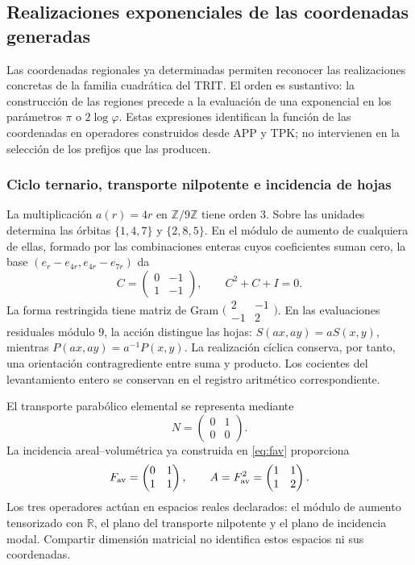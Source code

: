 \subsection{Realizaciones exponenciales de las coordenadas generadas}
\label{euler-trit-articulacion}

Las coordenadas regionales ya determinadas permiten reconocer las
realizaciones concretas de la familia cuadrática del TRIT. El orden es
sustantivo: la construcción de las regiones precede a la evaluación de una
exponencial en los parámetros \(\pi\) o \(2\log\varphi\). Estas expresiones
identifican la función de las coordenadas en operadores construidos desde
APP y TPK; no intervienen en la selección de los prefijos que las producen.

\subsubsection{Ciclo ternario, transporte nilpotente e incidencia de hojas}

La multiplicación \(a(r)=4r\) en \(\mathbb Z/9\mathbb Z\) tiene orden
\(3\). Sobre las unidades determina las órbitas \(\{1,4,7\}\) y
\(\{2,8,5\}\). En el módulo de aumento de cualquiera de ellas, formado por
las combinaciones enteras cuyos coeficientes suman cero, la base
\((e_r-e_{4r},e_{4r}-e_{7r})\) da
\[
 C=\begin{pmatrix}0&-1\\1&-1\end{pmatrix},
 \qquad C^2+C+I=0.
\]
La forma restringida tiene matriz de Gram
\(\bigl(\begin{smallmatrix}2&-1\\-1&2\end{smallmatrix}\bigr)\).
En las evaluaciones residuales módulo \(9\), la acción distingue las hojas:
\(S(ax,ay)=aS(x,y)\), mientras \(P(ax,ay)=a^{-1}P(x,y)\).
La realización cíclica conserva, por tanto, una orientación contragrediente
entre suma y producto. Los cocientes del levantamiento entero se conservan
en el registro aritmético correspondiente.

El transporte parabólico elemental se representa mediante
\[
 N=\begin{pmatrix}0&1\\0&0\end{pmatrix}.
\]
La incidencia areal--volumétrica ya construida en \eqref{eq:fav} proporciona
\[
 F_{\rm av}=\begin{pmatrix}0&1\\1&1\end{pmatrix},
 \qquad A=F_{\rm av}^2=\begin{pmatrix}1&1\\1&2\end{pmatrix}.
\]
Los tres operadores actúan en espacios reales declarados: el módulo de
aumento tensorizado con \(\mathbb R\), el plano del transporte nilpotente y
el plano de incidencia modal. Compartir dimensión matricial no identifica
estos espacios ni sus coordenadas.

